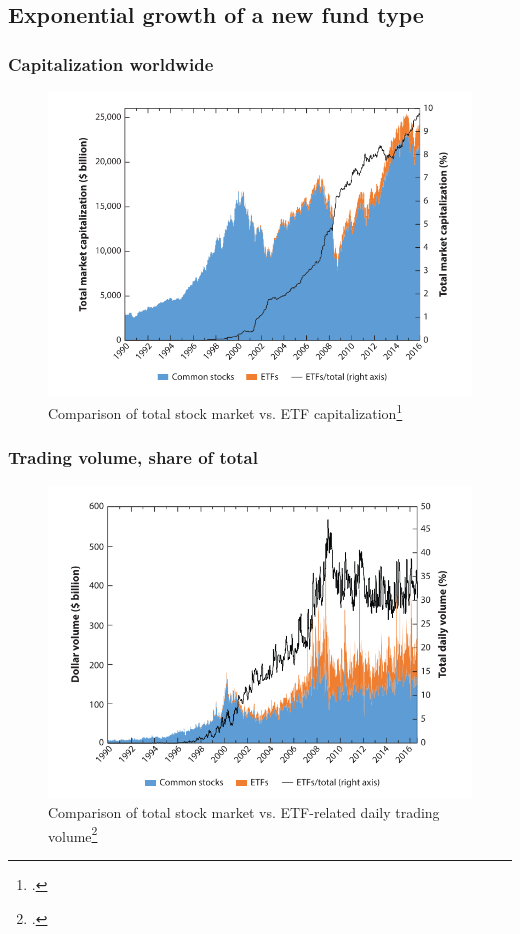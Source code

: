 \documentclass[handout, 9pt, usenames, dvipsnames]{beamer}
\begin{document}
\subsection{Exponential growth of a new fund type}
\begin{frame}
  \frametitle{Capitalization worldwide}
  \begin{figure}
    \centering
    \caption{Comparison of total stock market vs. ETF capitalization\footcite[172]{Ben-David2017}}
    \label{fig:Fig1_MarketCap}
    \includegraphics[width = \textwidth, height = 0.65\paperheight, keepaspectratio]{Fig1_MarketCap}
  \end{figure}
\end{frame}


\begin{frame}
  \frametitle{Trading volume, share of total}
  \begin{figure}
    \centering
    \caption{Comparison of total stock market vs. ETF-related daily trading volume\footcite[173]{Ben-David2017}}
    \label{fig:Fig2_Volume}
    \includegraphics[width = \textwidth, height = 0.65\paperheight, keepaspectratio]{Fig2_Volume}
  \end{figure}
\end{frame}
\end{document}
